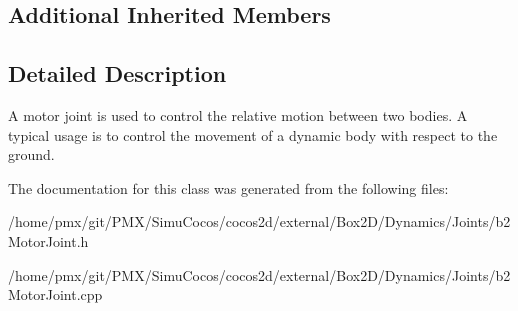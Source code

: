 \subsection*{Additional Inherited Members}


\subsection{Detailed Description}
A motor joint is used to control the relative motion between two bodies. A typical usage is to control the movement of a dynamic body with respect to the ground. 

The documentation for this class was generated from the following files\+:\begin{DoxyCompactItemize}
\item 
/home/pmx/git/\+P\+M\+X/\+Simu\+Cocos/cocos2d/external/\+Box2\+D/\+Dynamics/\+Joints/b2\+Motor\+Joint.\+h\item 
/home/pmx/git/\+P\+M\+X/\+Simu\+Cocos/cocos2d/external/\+Box2\+D/\+Dynamics/\+Joints/b2\+Motor\+Joint.\+cpp\end{DoxyCompactItemize}
